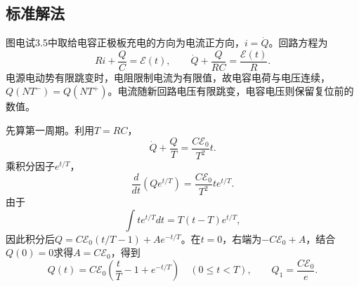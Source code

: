 \documentclass[UTF8,fontset=fandol,a4paper,11pt]{ctexart}
\begin{document}

\subsection*{标准解法}


图电试3.5中取给电容正极板充电的方向为电流正方向，$i=\dot Q$。回路方程为
\[
Ri+\frac QC=\mathcal E(t),\qquad
\boxed{\dot Q+\frac Q{RC}=\frac{\mathcal E(t)}R}.
\]
电源电动势有限跳变时，电阻限制电流为有限值，故电容电荷与电压连续，$Q(NT^-)=Q(NT^+)$。电流随新回路电压有限跳变，电容电压则保留复位前的数值。

先算第一周期。利用$T=RC$，
\[
\dot Q+\frac QT=\frac{C\mathcal E_0}{T^2}t.
\]
乘积分因子$e^{t/T}$，
\[
\frac d{dt}(Qe^{t/T})
=\frac{C\mathcal E_0}{T^2}t e^{t/T}.
\]
由于
\[
\int t e^{t/T}dt=T(t-T)e^{t/T},
\]
因此积分后$Q=C\mathcal E_0(t/T-1)+Ae^{-t/T}$。在$t=0$，右端为$-C\mathcal E_0+A$，结合$Q(0)=0$求得$A=C\mathcal E_0$，得到
\[
\boxed{Q(t)=C\mathcal E_0\left(\frac tT-1+e^{-t/T}\right)}
\quad(0\le t<T),\qquad
Q_1=\frac{C\mathcal E_0}{e}.
\]
\end{document}
